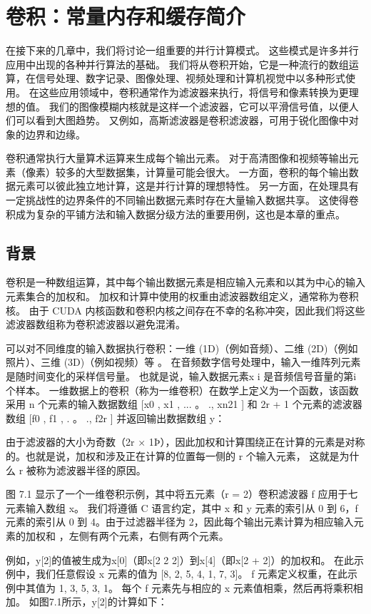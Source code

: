\section{卷积：常量内存和缓存简介}
在接下来的几章中，我们将讨论一组重要的并行计算模式。 这些模式是许多并行应用中出现的各种并行算法的基础。 
我们将从卷积开始，它是一种流行的数组运算，在信号处理、数字记录、图像处理、视频处理和计算机视觉中以多种形式使用。 
在这些应用领域中，卷积通常作为滤波器来执行，将信号和像素转换为更理想的值。 
我们的图像模糊内核就是这样一个滤波器，它可以平滑信号值，以便人们可以看到大图趋势。 
又例如，高斯滤波器是卷积滤波器，可用于锐化图像中对象的边界和边缘。

卷积通常执行大量算术运算来生成每个输出元素。 对于高清图像和视频等输出元素（像素）较多的大型数据集，计算量可能会很大。 
一方面，卷积的每个输出数据元素可以彼此独立地计算，这是并行计算的理想特性。 
另一方面，在处理具有一定挑战性的边界条件的不同输出数据元素时存在大量输入数据共享。 
这使得卷积成为复杂的平铺方法和输入数据分级方法的重要用例，这也是本章的重点。

\subsection{背景}
卷积是一种数组运算，其中每个输出数据元素是相应输入元素和以其为中心的输入元素集合的加权和。 加权和计算中使用的权重由滤波器数组定义，通常称为卷积核。 由于 CUDA 内核函数和卷积内核之间存在不幸的名称冲突，因此我们将这些滤波器数组称为卷积滤波器以避免混淆。

可以对不同维度的输入数据执行卷积：一维 (1D)（例如音频）、二维 (2D)（例如照片）、三维 (3D)（例如视频）等 。 在音频数字信号处理中，输入一维阵列元素是随时间变化的采样信号量。 也就是说，输入数据元素x i 是音频信号音量的第i个样本。 一维数据上的卷积（称为一维卷积）在数学上定义为一个函数，该函数采用 n 个元素的输入数据数组 [x0 , x1 , ... 。 ., xn21 ] 和 2r + 1 个元素的滤波器数组 [f0 , f1 , . 。 ., f2r ] 并返回输出数据数组 y：

由于滤波器的大小为奇数（2r × 1Þ），因此加权和计算围绕正在计算的元素是对称的。也就是说，加权和涉及正在计算的位置每一侧的 r 个输入元素， 这就是为什么 r 被称为滤波器半径的原因。

图 7.1 显示了一个一维卷积示例，其中将五元素（r = 2）卷积滤波器 f 应用于七元素输入数组 x。 我们将遵循 C 语言约定，其中 x 和 y 元素的索引从 0 到 6，f 元素的索引从 0 到 4。由于过滤器半径为 2，因此每个输出元素计算为相应输入元素的加权和 ，左侧有两个元素，右侧有两个元素。

例如，y[2]的值被生成为x[0]（即x[2 2 2]）到x[4]（即x[2 + 2]）的加权和。 在此示例中，我们任意假设 x 元素的值为 [8, 2, 5, 4, 1, 7, 3]。 f 元素定义权重，在此示例中其值为 1, 3, 5, 3, 1。 每个 f 元素先与相应的 x 元素值相乘，然后再将乘积相加。 如图7.1所示，y[2]的计算如下：

